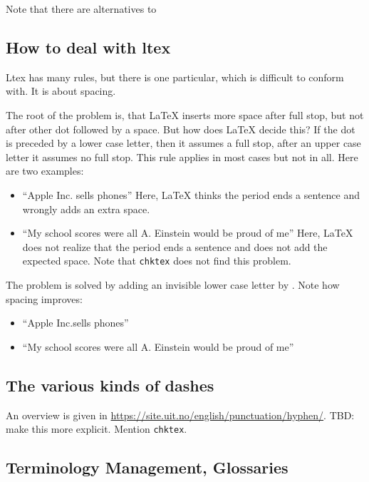 \documentclass[a4paper,12pt]{article}
\begin{document}
Note that there are alternatives to 


\subsection{How to deal with ltex}\label{subsec:ltex}

Ltex has many rules, but there is one particular, which is difficult to conform with. 
It is about spacing. 

The root of the problem is, that \LaTeX{} inserts more space after full stop, 
but not after other dot followed by a space. 
But how does \LaTeX{} decide this? If the dot is preceded by a lower case letter, 
then it assumes a full stop, after an upper case letter it assumes no full stop. 
This rule applies in most cases but not in all. 
Here are two examples: 
%
\begin{itemize}
  \item ``Apple Inc. sells phones''%
  Here, \LaTeX{} thinks the period ends a sentence and wrongly adds an extra space.
  \item ``My school scores were all A. Einstein would be proud of me''
  Here, \LaTeX{} does not realize that the period ends a sentence 
  and does not add the expected space. 
  Note that \texttt{chktex} does not find this problem. 
\end{itemize}

The problem is solved by adding an invisible lower case letter by \texttt{\textbackslash@}. 
Note how spacing improves: 
%
\begin{itemize}
  \item ``Apple Inc.\@ sells phones''
  \item ``My school scores were all A\@. Einstein would be proud of me''
\end{itemize}

\subsection{The various kinds of dashes}\label{subsec:dashes}

An overview is given in 
\url{https://site.uit.no/english/punctuation/hyphen/}. 
TBD\@: make this more explicit. 
Mention \texttt{chktex}. 

\subsection{Terminology Management, Glossaries}\label{subsec:glos}
\end{document}
